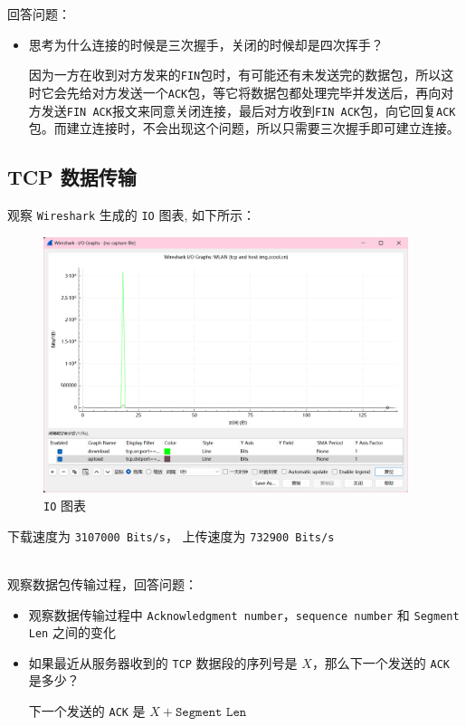 \documentclass{article}
\begin{document}
回答问题：

\begin{itemize}[noitemsep]
  \item 思考为什么连接的时候是三次握手，关闭的时候却是四次挥手？

        因为一方在收到对方发来的\texttt{FIN}包时，有可能还有未发送完的数据包，所以这时它会先给对方发送一个\texttt{ACK}包，等它将数据包都处理完毕并发送后，再向对方发送\texttt{FIN ACK}报文来同意关闭连接，最后对方收到\texttt{FIN ACK}包，向它回复\texttt{ACK}包。而建立连接时，不会出现这个问题，所以只需要三次握手即可建立连接。

\end{itemize}

\subsection{TCP 数据传输}

观察 \texttt{Wireshark} 生成的 \texttt{IO} 图表, 如下所示：

\begin{figure}[H]
  \centering
  \includegraphics[width=0.95\textwidth]{img/10.png}
  \caption{\texttt{IO} 图表}
\end{figure}

下载速度为 \texttt{3107000 Bits/s}，
上传速度为 \texttt{732900 Bits/s}

~\\
观察数据包传输过程，回答问题：

\begin{itemize}[noitemsep]
  \item 观察数据传输过程中 \texttt{Acknowledgment number}，\texttt{sequence number} 和 \texttt{Segment Len} 之间的变化

  \item 如果最近从服务器收到的 \texttt{TCP} 数据段的序列号是 $X$，那么下一个发送的 \texttt{ACK} 是多少？

        下一个发送的 \texttt{ACK} 是 $X + \texttt{Segment Len}$

\end{itemize}
\end{document}
